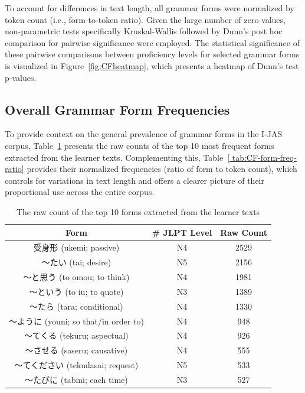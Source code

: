 To account for differences in text length, all grammar forms were normalized by token count (i.e., form-to-token
ratio). Given the large number of zero values, non-parametric tests specifically Kruskal-Wallis followed by Dunn's
post hoc comparison for pairwise significance were employed. The statistical significance of these pairwise
comparisons between proficiency levels for selected grammar forms is visualized in Figure~\ref{fig:CFheatmap}, which
presents a heatmap of Dunn's test p-values.


\subsection{Overall Grammar Form Frequencies}
To provide context on the general prevalence of grammar forms in the I-JAS corpus, Table~\ref{tab:CF-form-freq}
presents the raw counts of the top 10 most frequent forms extracted from the learner texts. Complementing this,
Table~\ref{
tab:CF-form-freq-ratio} provides their normalized frequencies (ratio of form to token count), which controls for
variations in text length and offers a clearer picture of their proportional use across the entire corpus.


\begin{table}[h!]
\centering
\begin{tabular}{ccc}
\hline \textbf{Form} & \textbf{\# JLPT Level} & \textbf{Raw Count} \\ \hline
受身形 (ukemi; passive)                & N4 & 2529 \\
〜たい (tai; desire)                  & N5 & 2156 \\
〜と思う (to omou; to think)          & N4 & 1981 \\
〜という (to iu; to quote)            & N3 & 1389 \\
〜たら (tara; conditional)            & N4 & 1330 \\
〜ように (youni; so that/in order to) & N4 & 948 \\
〜てくる (tekuru; aspectual)          & N4 & 926 \\
〜させる (saseru; causative)          & N4 & 555 \\
〜てください (tekudasai; request)     & N5 & 533 \\
〜たびに (tabini; each time)          & N3 & 527 \\
\hline
\end{tabular}
\caption[Raw frequency of Top 10 Forms extracted from the I-JAS Corpus]{The raw count of the top 10 forms extracted
from the learner texts}
\label{tab:CF-form-freq}
\end{table}

